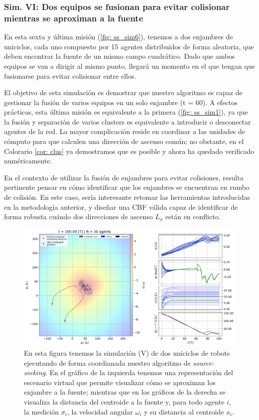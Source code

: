 \subsubsection*{Sim. VI: Dos equipos se fusionan para evitar colisionar mientras se aproximan a la fuente}

En esta sexta y última misión (\autoref{fig: ss_sim6}), tenemos a dos enjambres de uniciclos, cada uno compuesto por 15 agentes distribuidos de forma aleatoria, que deben encontrar la fuente de un mismo campo cuadrático. Dado que ambos equipos se van a dirigir al mismo punto, llegará un momento en el que tengan que fusionarse para evitar colisionar entre ellos.

El objetivo de esta simulación es demostrar que nuestro algoritmo es capaz de gestionar la fusión de varios equipos en un solo enjambre (t = 60). A efectos prácticas, esta última misión es equivalente a la primera (\autoref{fig: ss_sim1}), ya que la fusión y separación de varios clusters es equivalente a introducir o desconectar agentes de la red. La mayor complicación reside en coordinar a las unidades de cómputo para que calculen una dirección de ascenso común; no obstante, en el Colorario \ref{cor: clus} ya demostramos que es posible y ahora ha quedado verificado numéricamente.

En el contexto de utilizar la fusión de enjambres para evitar colisiones, resulta pertinente pensar en cómo identificar que los enjambres se encuentran en rumbo de colisión. En este caso, sería interesante retomar las herramientas introducidas en la metodología anterior, y diseñar una CBF válida capaz de identificar de forma robusta cuándo dos direcciones de ascenso $L_\sigma$ están en conflicto.

\newpage

\begin{figure}[!h]
\centering
\includegraphics[trim={0cm 0.0cm 0cm 0.0cm}, clip, width=1\columnwidth]{./fig/ss_sim6.png}
\caption{En esta figura tenemos la simulación (V) de dos uniciclos de robots ejecutando de forma coordianada nuestro algoritmo de \textit{source-seeking}. En el gráfico de la izquierda tenemos una representación del escenario virtual que permite visualizar cómo se aproximan los enjambre a la fuente; mientras que en los gráficos de la derecha se visualiza la distancia del centroide a la fuente y, para todo agente $i$, la medición $\sigma_i$, la velocidad angular $\omega_i$ y su distancia al centroide $x_i$.}
\label{fig: ss_sim6}
\end{figure}


